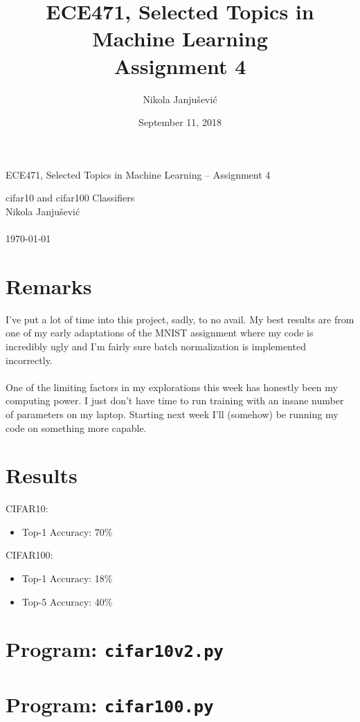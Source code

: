 \documentclass[10pt,a4paper]{article}
\author{Nikola Janju\v{s}evi\'{c}}
\title{ECE471, Selected Topics in Machine Learning \\ Assignment 4}
\date{September 11, 2018}
\begin{document}
\begin{large}
ECE471, Selected Topics in Machine Learning -- Assignment 4 \\
\end{large}
cifar10 and cifar100 Classifiers \\
Nikola Janju\v{s}evi\'{c} \\\\
\today

\section*{Remarks}
I've put a lot of time into this project, sadly, to no avail. My best results are from one of my early adaptations of the MNIST assignment where my code is incredibly ugly and I'm fairly sure batch normalization is implemented incorrectly. \\\\
One of the limiting factors in my explorations this week has honestly been my computing power. I just don't have time to run training with an insane number of parameters on my laptop. Starting next week I'll (somehow) be running my code on something more capable.

\section*{Results}
CIFAR10:
\begin{itemize}
	\item Top-1 Accuracy: 70\%
\end{itemize}

CIFAR100:
\begin{itemize}
	\item Top-1 Accuracy: 18\%
	\item Top-5 Accuracy: 40\%
\end{itemize}

\pagebreak
\section*{Program: \texttt{cifar10v2.py}}



\pagebreak
\section*{Program: \texttt{cifar100.py}}


\end{document}
